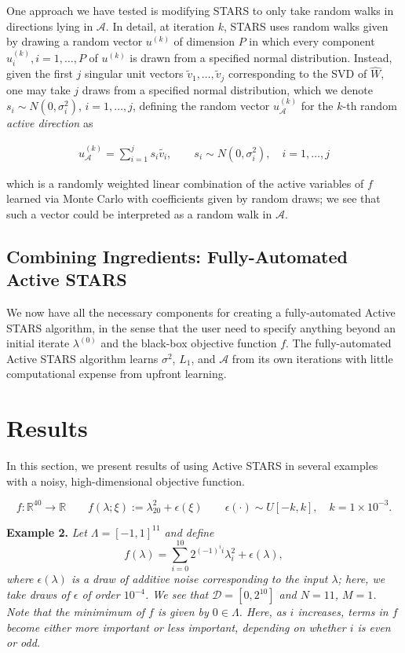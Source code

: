\documentclass{amsart}
\newcommand{\A}{\mathcal{A}}
\begin{document}
One approach we have tested is modifying STARS to only take random walks in directions lying in $\A$. In detail, at iteration $k$, STARS uses random walks given by drawing a random vector $u^{(k)}$ of dimension $P$ in which every component $u_i^{(k)},i=1,\ldots,P$ of $u^{(k)}$ is  drawn from a specified normal distribution. Instead, given the first $j$ singular unit vectors $\tilde{v}_1,\ldots,\tilde{v}_j$ corresponding to the SVD of $\hat{W}$, one may take $j$ draws from a specified normal distribution, which we denote $s_i\sim N(0,\sigma_i^2)$, $i=1,\ldots,j$, defining the random vector $u_\A^{(k)}$ for the $k$-th random \textit{active direction} as 

\begin{eqnarray}
u_\A^{(k)}=\sum_{i=1}^j s_i\tilde{v_i}, \quad \quad s_i\sim N(0,\sigma_i^2), \quad i=1,\ldots,j
\end{eqnarray}


\noindent which is a randomly weighted linear combination of the active variables of $f$ learned via Monte Carlo with coefficients given by random draws; we see that such a vector could be interpreted as a random walk in $\A$.

\subsection{Combining Ingredients: Fully-Automated Active STARS} We now have all the necessary components for creating a fully-automated Active STARS algorithm, in the sense that the user need to specify anything beyond an initial iterate $\lambda^{(0)}$ and the black-box objective function $f$. The fully-automated Active STARS algorithm learns $\sigma^2$, $L_1$, and $\A$ from its own iterations with little computational expense from upfront learning.






\section{Results}

In this section, we present results of using Active STARS in several examples with a noisy, high-dimensional objective function.

$$f: \mathbb{R}^{40} \to \mathbb{R} \quad \quad  f(\lambda; \xi):=\lambda_{20}^2 + \epsilon(\xi) \quad \quad \epsilon(\cdot) \sim U[-k,k], \quad k=1 \times 10^{-3}.$$

\noindent \textbf{Example 2.} \textit{Let $\Lambda=[-1,1]^{11}$ and define $$f(\lambda)=\sum_{i=0}^{10} 2^{(-1)^i i}\lambda_i^2+\epsilon(\lambda),$$ where $\epsilon(\lambda)$ is a draw of additive noise corresponding to the input $\lambda$; here, we take draws of $\epsilon$ of order $10^{-4}$. We see that $\mathcal{D}=[0,2^{10}]$ and $N=11$, $M=1$. Note that the minimimum of $f$ is given by $0 \in \Lambda$. Here, as $i$ increases, terms in $f$ become either more important or less important, depending on whether $i$ is even or odd.}
\end{document}
